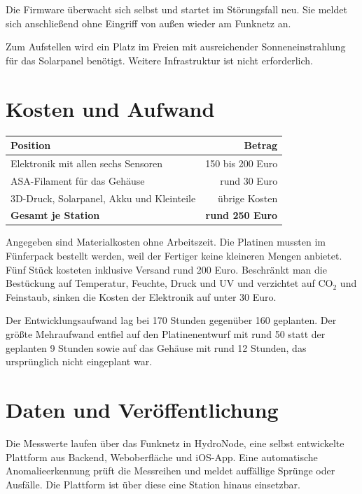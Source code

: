 \documentclass[11pt,a4paper]{scrartcl}
\begin{document}
Die Firmware überwacht sich selbst und startet im Störungsfall neu. Sie meldet sich anschließend ohne Eingriff von außen wieder am Funknetz an.

Zum Aufstellen wird ein Platz im Freien mit ausreichender Sonneneinstrahlung für das Solarpanel benötigt. Weitere Infrastruktur ist nicht erforderlich.

\section*{Kosten und Aufwand}

\begin{table}[h]
  \centering
  \begin{tabularx}{\textwidth}{Lr}
    \toprule
    \textbf{Position} & \textbf{Betrag} \\
    \midrule
    Elektronik mit allen sechs Sensoren                  & 150 bis 200 Euro \\
    ASA\hspace{0pt}-Filament für das Gehäuse            & rund 30 Euro \\
    3D\hspace{0pt}-Druck, Solarpanel, Akku und Kleinteile & übrige Kosten \\
    \midrule
    \textbf{Gesamt je Station}                          & \textbf{rund 250 Euro} \\
    \bottomrule
  \end{tabularx}
\end{table}

Angegeben sind Materialkosten ohne Arbeitszeit. Die Platinen mussten im Fünferpack bestellt werden, weil der Fertiger keine kleineren Mengen anbietet. Fünf Stück kosteten inklusive Versand rund 200 Euro. Beschränkt man die Bestückung auf Temperatur, Feuchte, Druck und UV und verzichtet auf CO$_2$ und Feinstaub, sinken die Kosten der Elektronik auf unter 30 Euro.

Der Entwicklungsaufwand lag bei 170 Stunden gegenüber 160 geplanten. Der größte Mehraufwand entfiel auf den Platinenentwurf mit rund 50 statt der geplanten 9 Stunden sowie auf das Gehäuse mit rund 12 Stunden, das ursprünglich nicht eingeplant war.

\section*{Daten und Veröffentlichung}

Die Messwerte laufen über das Funknetz in HydroNode, eine selbst entwickelte Plattform aus Backend, Weboberfläche und iOS\hspace{0pt}-App. Eine automatische Anomalieerkennung prüft die Messreihen und meldet auffällige Sprünge oder Ausfälle. Die Plattform ist über diese eine Station hinaus einsetzbar.
\end{document}
